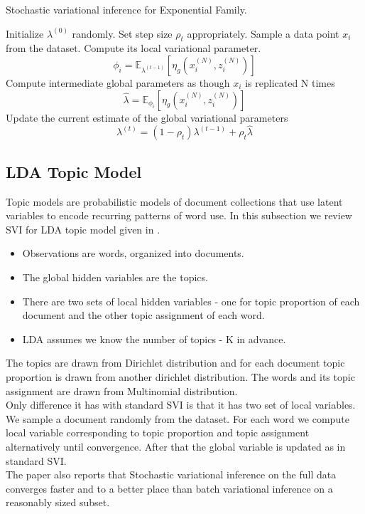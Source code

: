 \documentclass{article} %
\begin{document}
        \begin{algorithm}
            \caption{Stochastic variational inference for Exponential Family. 
            \label{stoch-vi}}
            \begin{algorithmic}
                \STATE Initialize $\lambda^{(0)}$ randomly.
                \STATE Set step size $\rho_t$ appropriately.
                \REPEAT
                \STATE \hspace{1cm} Sample a data point $x_i$ from the dataset.
                \STATE \hspace{1cm} Compute its local variational parameter. $$\phi_{i} = \mathbb{E}_{\lambda^{(t-1)}}[\eta_g(x_i^{(N)}, z_i^{(N)})]$$
                \STATE \hspace{1cm} Compute intermediate global parameters as though $x_i$ is replicated N times $$\hat{\lambda} = \mathbb{E}_{\phi_i}[\eta_g(x_i^{(N)}, z_i^{(N)})]$$
                \STATE \hspace{1cm} Update the current estimate of the global variational parameters $$\lambda^{(t)} = (1-\rho_t)\lambda^{(t-1)} + \rho_t \hat{\lambda}$$
            \end{algorithmic}
        \end{algorithm}
        
    \subsection{LDA Topic Model}
    Topic models are probabilistic models of document collections that use latent variables to encode recurring patterns of word use. In this subsection we review SVI for LDA topic model given in \cite{svi}.\\
    \begin{itemize}
        \item Observations are words, organized into documents. 
        \item The global hidden variables are the topics. 
        \item There are two sets of local hidden variables - one for topic proportion of each document and the other topic assignment of each word. 
        \item LDA assumes we know the number of topics - K in advance. 
    \end{itemize}
    The topics are drawn from Dirichlet distribution and for each document topic proportion is drawn from another dirichlet distribution. The words and its topic assignment are drawn from Multinomial distribution. \\
    Only difference it has with standard SVI is that it has two set of local variables. We sample a document randomly from the dataset. For each word we compute local variable corresponding to topic proportion and topic assignment alternatively until convergence. After that the global variable is updated as in standard SVI. \\
    The paper also reports that Stochastic variational inference on the full data converges faster and to a better place than batch variational inference on a reasonably sized
subset.
    
\end{document}
